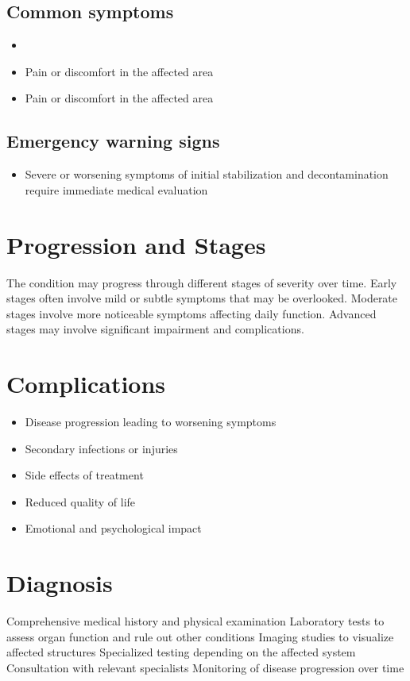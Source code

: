 \subsection{Common symptoms}
\begin{itemize}[noitemsep]
  \item \item Pain or discomfort in the affected area    \item Pain or discomfort in the affected area
  \end{itemize}

\subsection{Emergency warning signs}
\begin{itemize}[noitemsep]
  \item Severe or worsening symptoms of initial stabilization and decontamination require immediate medical evaluation
\end{itemize}
\section{Progression and Stages}
The condition may progress through different stages of severity over time. Early stages often involve mild or subtle symptoms that may be overlooked. Moderate stages involve more noticeable symptoms affecting daily function. Advanced stages may involve significant impairment and complications.
\section{Complications}
\begin{itemize}[noitemsep]
  \item Disease progression leading to worsening symptoms
  \item Secondary infections or injuries
  \item Side effects of treatment
  \item Reduced quality of life
  \item Emotional and psychological impact
\end{itemize}
\section{Diagnosis}
Comprehensive medical history and physical examination Laboratory tests to assess organ function and rule out other conditions Imaging studies to visualize affected structures Specialized testing depending on the affected system Consultation with relevant specialists Monitoring of disease progression over time

